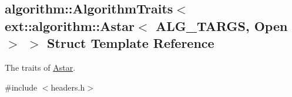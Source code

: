 \hypertarget{structalgorithm_1_1AlgorithmTraits_3_01ext_1_1algorithm_1_1Astar_3_01ALG__TARGS_00_01Open_01_4_01_4}{}\subsection{algorithm\+:\+:Algorithm\+Traits$<$ ext\+:\+:algorithm\+:\+:Astar$<$ A\+L\+G\+\_\+\+T\+A\+R\+GS, Open $>$ $>$ Struct Template Reference}
\label{structalgorithm_1_1AlgorithmTraits_3_01ext_1_1algorithm_1_1Astar_3_01ALG__TARGS_00_01Open_01_4_01_4}


The traits of \hyperlink{structAstar}{Astar}.  




{\ttfamily \#include $<$headers.\+h$>$}

